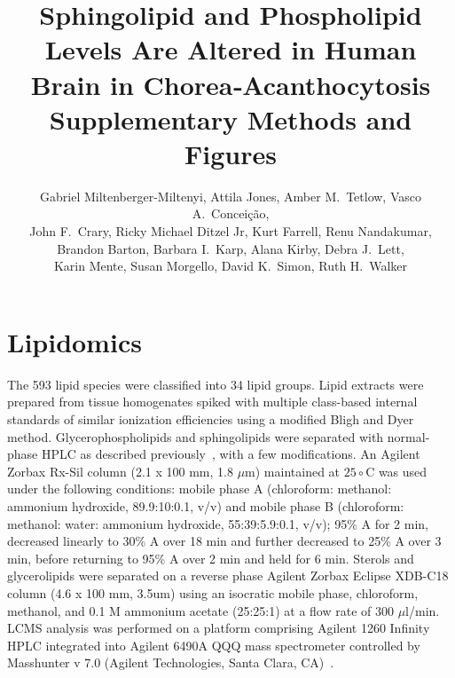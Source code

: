 \documentclass[letterpaper]{article}
\begin{document}
\title{Sphingolipid and Phospholipid Levels Are Altered in Human Brain in Chorea‐Acanthocytosis
	\\
{\large Supplementary Methods and Figures}}

\author{Gabriel Miltenberger-Miltenyi, Attila Jones, Amber M.~Tetlow,  Vasco A.~Conceição, 
\\
	John F.~Crary, Ricky Michael Ditzel Jr, Kurt Farrell, Renu Nandakumar,
\\
	Brandon Barton, Barbara I.~Karp,  Alana Kirby, Debra J.~Lett,
\\
	Karin Mente, Susan Morgello, David K.~Simon, Ruth H.~Walker}
\date{}
\maketitle

\renewcommand{\contentsname}{Supplementary Methods}
\tableofcontents
\renewcommand*\listfigurename{Supplementary Figures}
\listoffigures

\setcounter{table}{4}
\makeatletter 
\renewcommand{\tablename}{Supplementary Table S} %
\makeatother

\section{Lipidomics}

The 593 lipid species were classified into 34 lipid groups.  Lipid extracts
were prepared from tissue homogenates spiked with multiple class-based
internal standards of similar ionization efficiencies using a modified Bligh and Dyer method.
Glycerophospholipids and sphingolipids were separated with normal-phase HPLC
as described previously~\citep{CHAN20122678}, with a few modifications. An
Agilent Zorbax Rx-Sil column (2.1 x 100 mm, 1.8 $\mu$m) maintained at
$25\circ$C was used under the following conditions: mobile phase A
(chloroform: methanol: ammonium hydroxide, 89.9:10:0.1, v/v) and mobile phase
B (chloroform: methanol: water: ammonium hydroxide, 55:39:5.9:0.1, v/v); 95\%
A for 2 min, decreased linearly to 30\% A over 18 min and further decreased to
25\% A over 3 min, before returning to 95\% A over 2 min and held for 6 min.
Sterols and glycerolipids were separated on a reverse phase
Agilent Zorbax Eclipse XDB-C18 column (4.6 x 100 mm, 3.5um) using an isocratic
mobile phase, chloroform, methanol, and 0.1 M ammonium acetate (25:25:1) at a
flow rate of 300 $\mu$l/min. LCMS analysis was performed on a platform
comprising Agilent 1260 Infinity HPLC integrated into Agilent 6490A QQQ mass
spectrometer controlled by Masshunter v 7.0 (Agilent Technologies, Santa
Clara, CA)~\citep{Chan2017}.
\end{document}
